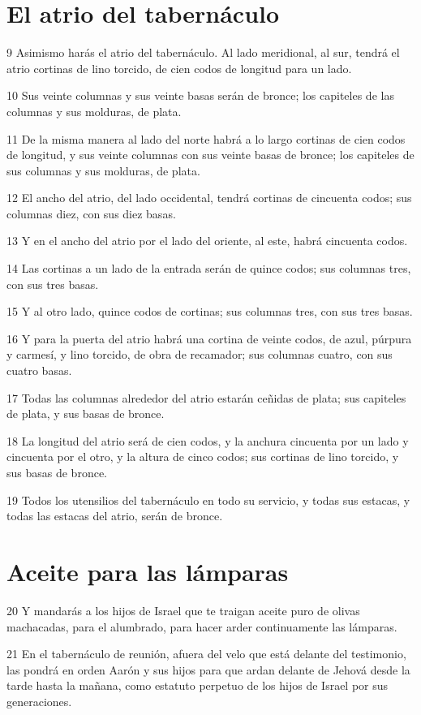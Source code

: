 \section*{El atrio del tabernáculo}

\par 9 Asimismo harás el atrio del tabernáculo. Al lado meridional, al sur, tendrá el atrio cortinas de lino torcido, de cien codos   de longitud para un lado.
\par 10 Sus veinte columnas y sus veinte basas serán de bronce; los capiteles de las columnas y sus molduras, de plata.
\par 11 De la misma manera al lado del norte habrá a lo largo cortinas de cien codos   de longitud, y sus veinte columnas con sus veinte basas de bronce; los capiteles de sus columnas y sus molduras, de plata.
\par 12 El ancho del atrio, del lado occidental, tendrá cortinas de cincuenta codos; sus columnas diez, con sus diez basas.
\par 13 Y en el ancho del atrio por el lado del oriente, al este, habrá cincuenta codos.
\par 14 Las cortinas a un lado de la entrada serán de quince codos;  sus columnas tres, con sus tres basas.
\par 15 Y al otro lado, quince codos   de cortinas; sus columnas tres, con sus tres basas.
\par 16 Y para la puerta del atrio habrá una cortina de veinte codos, de azul, púrpura y carmesí, y lino torcido, de obra de recamador; sus columnas cuatro, con sus cuatro basas.
\par 17 Todas las columnas alrededor del atrio estarán ceñidas de plata; sus capiteles de plata, y sus basas de bronce.
\par 18 La longitud del atrio será de cien codos,  y la anchura cincuenta por un lado y cincuenta por el otro, y la altura de cinco codos; sus cortinas de lino torcido, y sus basas de bronce.
\par 19 Todos los utensilios del tabernáculo en todo su servicio, y todas sus estacas, y todas las estacas del atrio, serán de bronce.

\section*{Aceite para las lámparas}

\par 20 Y mandarás a los hijos de Israel que te traigan aceite puro de olivas machacadas, para el alumbrado, para hacer arder continuamente las lámparas.
\par 21 En el tabernáculo de reunión, afuera del velo que está delante del testimonio, las pondrá en orden Aarón y sus hijos para que ardan delante de Jehová desde la tarde hasta la mañana, como estatuto perpetuo de los hijos de Israel por sus generaciones.

